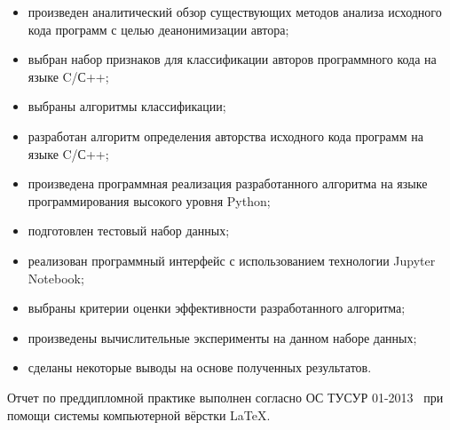 \begin{itemize}
  \item произведен аналитический обзор существующих методов анализа исходного кода программ с целью деанонимизации автора;
  \item выбран набор признаков для классификации авторов программного кода на языке C/С++; 
  \item выбраны алгоритмы классификации;
  \item разработан алгоритм определения авторства исходного кода программ на языке C/С++;
  \item произведена программная реализация разработанного алгоритма на языке программирования высокого уровня Python;
  \item подготовлен тестовый набор данных;
  \item реализован программный интерфейс с использованием технологии Jupyter Notebook;~\cite{jupyter}
  \item выбраны критерии оценки эффективности разработанного алгоритма;
  \item произведены вычислительные эксперименты на данном наборе данных;
  \item сделаны некоторые выводы на основе полученных результатов.
\end{itemize}

Отчет по преддипломной практике выполнен согласно ОС ТУСУР 01-2013~\cite{ostusur} при помощи системы компьютерной вёрстки \LaTeX. 
